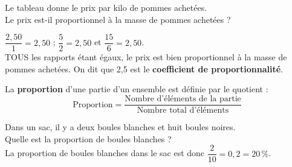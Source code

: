 \begin{Exemple}
Le tableau donne le prix par kilo de pommes achetées. \\
Le prix est-il proportionnel à la masse de pommes achetées ?
\begin{center}
\end{center}
$\dfrac{2,50}{1}=2,50$ ; $\dfrac{5}{2}=2,50$ et $\dfrac{15}{6}=2,50$.\\

TOUS les rapports étant égaux, le prix est bien proportionnel à la masse de pommes achetées. On dit que 2,5 est le \textbf{coefficient de proportionnalité}. 
\end{Exemple}

\begin{Définition}[c]
La \textbf{proportion} d'une partie d'un ensemble est définie par le quotient :
$$\text{Proportion} = \dfrac{\text{Nombre d'éléments de la partie}}{\text{Nombre total d'éléments}}$$
\end{Définition}

\begin{Exemple}
Dans un sac, il y a deux boules blanches et huit boules noires. \\
Quelle est la proportion de boules blanches ?\\
La proportion de boules blanches dans le sac est donc $\dfrac{2}{10} = 0,2 = 20\,\%$.
\end{Exemple}

